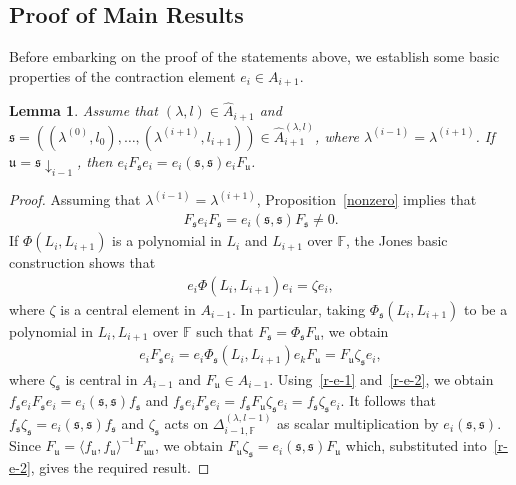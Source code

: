 \documentclass[11pt,a4paper,reqno,svgnames]{amsart}
\theoremstyle{plain}
\newtheorem{lemma}[theorem]{Lemma}
\theoremstyle{definition}
\numberwithin{equation}{section}
\begin{document}
\subsection{Proof of Main Results}
Before embarking on the proof of the statements above, we establish some basic properties of the contraction element $e_i\in A_{i+1}$.
\begin{lemma}\label{contract}
Assume that $(\lambda,l)\in\hat{A}_{i+1}$ and $\mathfrak{s}=((\lambda^{(0)},l_0),\ldots,(\lambda^{(i+1)},l_{i+1}))\in\hat{A}_{i+1}^{(\lambda,l)}$, where $\lambda^{(i-1)}=\lambda^{(i+1)}$. If $\mathfrak{u}=\mathfrak{s}\downarrow_{i-1}$, then $e_iF_\mathfrak{s}e_i=e_i(\mathfrak{s,s})e_i F_\mathfrak{u}$. 
\end{lemma}
\begin{proof}
Assuming that $\lambda^{(i-1)}=\lambda^{(i+1)}$, Proposition~\ref{nonzero} implies that
\begin{align}\label{r-e-1}
F_\mathfrak{s}e_{i}F_\mathfrak{s}=e_{i}(\mathfrak{s},\mathfrak{s})F_\mathfrak{s}\ne0.
\end{align}
If $\Phi(L_{i},L_{i+1})$ is a polynomial in $L_{i}$ and $L_{i+1}$ over $\mathbb{F}$, the Jones basic construction shows that 
\begin{align*}
e_{i}\Phi(L_{i},L_{i+1})e_{i}=\zeta e_{i},
\end{align*}
where $\zeta$ is a central element in $A_{i-1}$. In particular, taking $\Phi_\mathfrak{s}(L_{i},L_{i+1})$ to be a polynomial in $L_{i},L_{i+1}$ over $\mathbb{F}$ such that $F_\mathfrak{s}=\Phi_\mathfrak{s}F_\mathfrak{u}$, we obtain 
\begin{align}\label{r-e-2}
e_{i}F_\mathfrak{s}e_{i}=e_{i}\Phi_\mathfrak{s}(L_{i},L_{i+1})e_{k}F_\mathfrak{u}
=F_\mathfrak{u}\zeta_\mathfrak{s}e_{i},
\end{align}
where $\zeta_\mathfrak{s}$ is central in $A_{i-1}$ and $F_\mathfrak{u}\in A_{i-1}$. Using~\eqref{r-e-1} and~\eqref{r-e-2}, we obtain $f_\mathfrak{s}e_{i}F_\mathfrak{s}e_{i}=e_{i}(\mathfrak{s},\mathfrak{s})f_\mathfrak{s}$ and $f_\mathfrak{s}e_{i}F_\mathfrak{s}e_{i}
=f_\mathfrak{s}F_\mathfrak{u} \zeta_\mathfrak{s}e_{i}= f_\mathfrak{s} \zeta_\mathfrak{s}e_{i}$. It follows that $f_\mathfrak{s}\zeta_\mathfrak{s}=e_i(\mathfrak{s},\mathfrak{s})f_\mathfrak{s}$ and $\zeta_\mathfrak{s}$ acts on  $\Delta_{i-1,\mathbb{F}}^{(\lambda,{l}-1)}$ as scalar multiplication by $e_{i}(\mathfrak{s},\mathfrak{s})$. Since $F_\mathfrak{u}=\langle f_\mathfrak{u},f_\mathfrak{u}\rangle^{-1} F_\mathfrak{uu}$, we obtain $F_\mathfrak{u}\zeta_\mathfrak{s}=e_i(\mathfrak{s,s})F_\mathfrak{u}$ which, substituted into~\eqref{r-e-2}, gives the required result. 
\end{proof}
\end{document}

